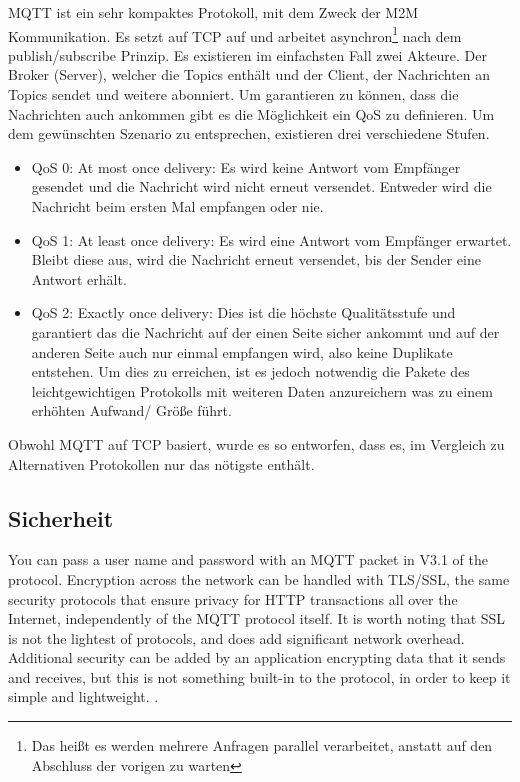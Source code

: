         \ac{MQTT} ist ein sehr kompaktes Protokoll, mit dem Zweck der \ac{M2M} Kommunikation.
        Es setzt auf TCP auf und arbeitet asynchron\footnote{Das heißt es werden mehrere Anfragen parallel verarbeitet, anstatt auf den Abschluss der vorigen zu warten} nach dem publish/subscribe Prinzip. Es existieren im einfachsten Fall zwei Akteure. Der Broker (Server), welcher die Topics enthält und der Client, der Nachrichten an Topics sendet und weitere abonniert.
        Um garantieren zu können, dass die Nachrichten auch ankommen gibt es die Möglichkeit ein \ac{QoS} zu definieren. Um dem gewünschten Szenario zu entsprechen, existieren drei verschiedene Stufen. 
        \cite{soni2017survey}
        \begin{itemize}
            \item \glqq QoS 0: At most once delivery\grqq{}: Es wird keine Antwort vom Empfänger gesendet und die Nachricht wird nicht erneut versendet. Entweder wird die Nachricht beim ersten Mal empfangen oder nie.
            \item \glqq QoS 1: At least once delivery\grqq{}: Es wird eine Antwort vom Empfänger erwartet. Bleibt diese aus, wird die Nachricht erneut versendet, bis der Sender eine Antwort erhält.
            \item \glqq QoS 2: Exactly once delivery\grqq{}: Dies ist die höchste Qualitätsstufe und garantiert das die Nachricht auf der einen Seite sicher ankommt und auf der anderen Seite auch nur einmal empfangen wird, also keine Duplikate entstehen. Um dies zu erreichen, ist es jedoch notwendig die Pakete des leichtgewichtigen Protokolls mit weiteren Daten anzureichern was zu einem erhöhten Aufwand/ Größe führt.
        \end{itemize} \cite{gupta_banks_2015}
        Obwohl \ac{MQTT} auf \ac{TCP} basiert, wurde es so entworfen, dass es, im Vergleich zu Alternativen Protokollen nur das nötigste enthält. \cite{soni2017survey}

    \subsection{Sicherheit}
        \glqq
        You can pass a user name and password with an MQTT packet in V3.1 of the protocol. Encryption across the network can be handled with TLS/SSL, the same security protocols
        that ensure privacy for HTTP transactions all over the Internet, independently of the MQTT protocol itself. It is worth noting that SSL is not the lightest of protocols, and does add significant network overhead. Additional security can be added by an application encrypting data that it sends and receives, but this is not something built-in to the protocol, in order to keep it simple and lightweight.\grqq{} \cite{mqtt_org_2019}.

